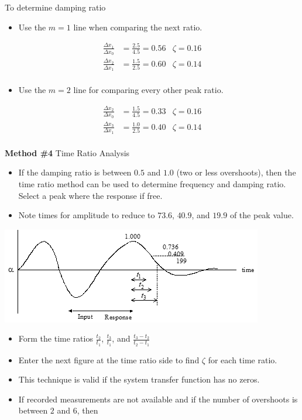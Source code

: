 \documentclass[
]{book}
\providecommand{\tightlist}{%
  \setlength{\itemsep}{0pt}\setlength{\parskip}{0pt}}
\begin{document}
To determine damping ratio

\begin{itemize}
\tightlist
\item
  Use the \(m = 1\) line when comparing the next ratio.
\end{itemize}

\[
\begin{align}
\frac{\Delta x_1}{\Delta x_0} &= \frac{2.5}{4.5} = 0.56 & \zeta = 0.16 \\
\frac{\Delta x_2}{\Delta x_1} &= \frac{1.5}{2.5} = 0.60 & \zeta = 0.14 \\
\end{align}
\]

\begin{itemize}
\tightlist
\item
  Use the \(m = 2\) line for comparing every other peak ratio.
\end{itemize}

\[
\begin{align}
\frac{\Delta x_2}{\Delta x_0} &= \frac{1.5}{4.5} = 0.33 & \zeta = 0.16 \\
\frac{\Delta x_3}{\Delta x_1} &= \frac{1.0}{2.5} = 0.40 & \zeta = 0.14 \\
\end{align}
\]

\textbf{Method \#4} Time Ratio Analysis

\begin{itemize}
\tightlist
\item
  If the damping ratio is between \(0.5\) and \(1.0\) (two or less overshoots), then the time ratio method can be used to determine frequency and damping ratio. Select a peak where the response if free.
\item
  Note times for amplitude to reduce to \(73.6%
  \), \(40.9%
  \), and \(19.9%
  \) of the peak value.
\end{itemize}

\includegraphics{media/08/image75.png}

\begin{itemize}
\tightlist
\item
  Form the time ratios \(\frac{t_2}{t_1}\), \(\frac{t_3}{t_1}\), and \(\frac{t_3 - t_2}{t_2 - t_1}\)
\item
  Enter the next figure at the time ratio side to find \(\zeta\) for each time ratio.
\item
  This technique is valid if the system transfer function has no zeros.
\item
  If recorded measurements are not available and if the number of overshoots is between \(2\) and \(6\), then
\end{itemize}
\end{document}
